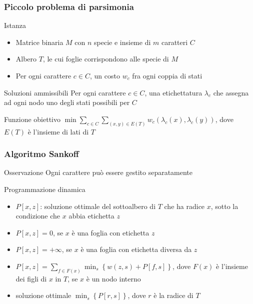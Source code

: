 \begin{frame}[fragile]
\frametitle{Piccolo problema di parsimonia}
\begin{block}{Istanza}
\begin{itemize}
\item
Matrice binaria $M$ con $n$ specie e insieme di $m$ caratteri $C$
\item
Albero $T$, le cui foglie corrispondono alle specie di $M$
\item
Per ogni carattere $c\in C$, un costo $w_{c}$ fra ogni coppia di stati
\end{itemize}
\end{block}
\begin{block}{Soluzioni ammissibili}
Per ogni carattere $c\in C$, una etichettatura $\lambda_{c}$ che assegna ad ogni nodo
uno degli stati possibili per $C$
\end{block}
\begin{block}{Funzione obiettivo}
$\min \sum_{c\in C} \sum_{(x,y)\in E(T)} w_{c}(\lambda_{c}(x), \lambda_{c}(y))$, dove $E(T)$ è
l'insieme di lati di $T$
\end{block}
\end{frame}

\begin{frame}[fragile]
\frametitle{Algoritmo Sankoff}
\begin{block}{Osservazione}
Ogni carattere può essere gestito separatamente
\end{block}

\begin{block}{Programmazione dinamica}
\begin{itemize}
\item
$P[x,z]$: soluzione ottimale del sottoalbero di $T$ che ha radice $x$, sotto la
condizione che $x$ abbia etichetta $z$
\item
$P[x,z] = 0$, se $x$ è una foglia con etichetta $z$
\item
$P[x,z] = +\infty$, se $x$ è una foglia con etichetta diversa da $z$
\item
$P[x,z] = \sum_{f \in F(x)} \min_{s} \left\{ w(z,s) + P[f,s] \right\}$, dove $F(x)$ è
l'insieme dei figli di $x$ in $T$, se $x$ è un nodo interno
\item
soluzione ottimale $\min_{s} \left\{ P[r,s] \right\}$, dove $r$ è la radice di
$T$
\end{itemize}
\end{block}
\end{frame}


